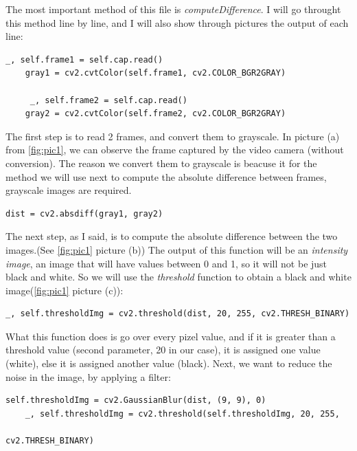 \documentclass[a4paper,12pt]{report}
\begin{document}
The most important method of this file is \textit{computeDifference}. I will go throught this method line by line, and I will also show through pictures the output of each line:

\begin{Verbatim}[frame=single]
    _, self.frame1 = self.cap.read()   
    gray1 = cv2.cvtColor(self.frame1, cv2.COLOR_BGR2GRAY)

     _, self.frame2 = self.cap.read()
    gray2 = cv2.cvtColor(self.frame2, cv2.COLOR_BGR2GRAY)
\end{Verbatim}



The first step is to read 2 frames, and convert them to grayscale. In picture (a) from \ref{fig:pic1}, we can observe the frame captured by the video camera (without conversion). The reason we convert them to grayscale is beacuse it for the method we will use next to compute the absolute difference between frames, grayscale images are required. 

\begin{Verbatim}[frame=single]
    dist = cv2.absdiff(gray1, gray2)
\end{Verbatim}

The next step, as I said, is to compute the absolute difference between the two images.(See \ref{fig:pic1} picture (b)) The output of this function will be an \textit{intensity image}, an image that will have values between 0 and 1, so it will not be just black and white. So we will use the \textit{threshold} function to obtain a black and white image(\ref{fig:pic1} picture (c)):

\begin{Verbatim}[frame=single]
    _, self.thresholdImg = cv2.threshold(dist, 20, 255, cv2.THRESH_BINARY)
\end{Verbatim}

What this function does is go over every pizel value, and if it is greater than a threshold value (second parameter, 20 in our case), it is assigned one value (white), else it is assigned another value (black). Next, we want to reduce the noise in the image, by applying a filter:

\begin{Verbatim}[frame=single]
    self.thresholdImg = cv2.GaussianBlur(dist, (9, 9), 0)
    _, self.thresholdImg = cv2.threshold(self.thresholdImg, 20, 255, 
                                                           cv2.THRESH_BINARY)
\end{Verbatim}
\end{document}
